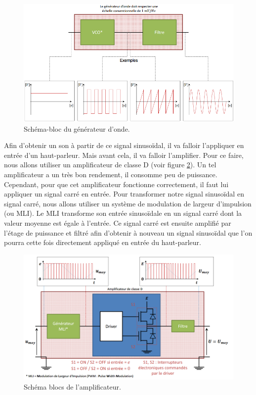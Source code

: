\begin{figure}[ht]
	\centering
	\includegraphics[scale=0.6]{img-gf/gf-generator.png}
	\caption{Schéma-bloc du générateur d'onde.}
	\label{fig:gf-generator}
\end{figure}

Afin d'obtenir un son à partir de ce signal sinusoïdal, il
va falloir l'appliquer en entrée d'un haut-parleur. Mais avant
cela, il va falloir l'amplifier. Pour ce faire, nous allons
utiliser un amplificateur de classe D (voir figure
\ref{fig:gf-ampli}). Un tel amplificateur
a	un très bon rendement, il consomme peu de puissance. Cependant,
pour que cet amplificateur fonctionne correctement, il faut
lui appliquer un signal carré en entrée. Pour transformer
notre signal sinusoïdal en signal carré, nous allons utiliser un
système de modulation de largeur d'impulsion (ou MLI). Le MLI
transforme son entrée sinusoïdale en un signal carré dont la
valeur moyenne est égale à l'entrée. Ce
signal carré est ensuite amplifié par l'étage de puissance
et filtré afin d'obtenir à nouveau un signal sinusoïdal que
l'on pourra cette fois directement appliqué en entrée du haut-parleur.

\begin{figure}[ht]
	\centering
	\includegraphics[scale=0.55]{img-gf/gf-ampli.png}
	\caption{Schéma blocs de l'amplificateur.}
	\label{fig:gf-ampli}
\end{figure}

